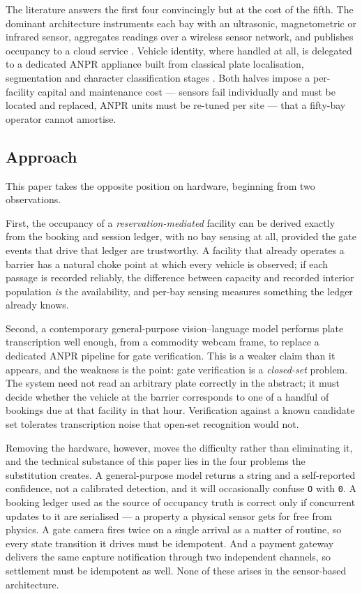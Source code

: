 \documentclass[journal,onecolumn,11pt]{IEEEtran}
\begin{document}
The literature answers the first four convincingly but at the cost of the
fifth. The dominant architecture instruments each bay with an ultrasonic,
magnetometric or infrared sensor, aggregates readings over a wireless sensor
network, and publishes occupancy to a cloud service
\cite{khanna2016iot,lin2017survey,kotb2016review}. Vehicle identity, where
handled at all, is delegated to a dedicated ANPR appliance built from classical
plate localisation, segmentation and character classification stages
\cite{anagnostopoulos2008survey,du2013alpr}. Both halves impose a per-facility
capital and maintenance cost --- sensors fail individually and must be located
and replaced, ANPR units must be re-tuned per site --- that a fifty-bay
operator cannot amortise.

\subsection{Approach}

This paper takes the opposite position on hardware, beginning from two
observations.

First, the occupancy of a \emph{reservation-mediated} facility can be derived
exactly from the booking and session ledger, with no bay sensing at all,
provided the gate events that drive that ledger are trustworthy. A facility
that already operates a barrier has a natural choke point at which every
vehicle is observed; if each passage is recorded reliably, the difference
between capacity and recorded interior population \emph{is} the availability,
and per-bay sensing measures something the ledger already knows.

Second, a contemporary general-purpose vision--language model \cite{gemini2023}
performs plate transcription well enough, from a commodity webcam frame, to
replace a dedicated ANPR pipeline for gate verification. This is a weaker claim
than it appears, and the weakness is the point: gate verification is a
\emph{closed-set} problem. The system need not read an arbitrary plate
correctly in the abstract; it must decide whether the vehicle at the barrier
corresponds to one of a handful of bookings due at that facility in that hour.
Verification against a known candidate set tolerates transcription noise that
open-set recognition would not.

Removing the hardware, however, moves the difficulty rather than eliminating
it, and the technical substance of this paper lies in the four problems the
substitution creates. A general-purpose model returns a string and a
self-reported confidence, not a calibrated detection, and it will occasionally
confuse \texttt{O} with \texttt{0}. A booking ledger used as the source of
occupancy truth is correct only if concurrent updates to it are serialised ---
a property a physical sensor gets for free from physics. A gate camera fires
twice on a single arrival as a matter of routine, so every state transition it
drives must be idempotent. And a payment gateway delivers the same capture
notification through two independent channels, so settlement must be idempotent
as well. None of these arises in the sensor-based architecture.
\end{document}
